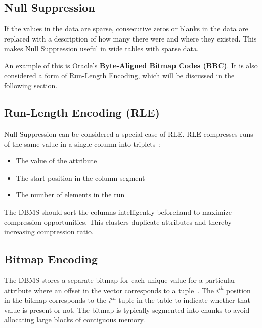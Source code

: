 \documentclass[11pt]{article}
\begin{document}
\subsection*{Null Suppression}
If the values in the data are sparse, consecutive zeros or blanks in the data are replaced with a description of how many there were and where they existed. This makes Null Suppression useful in wide tables with sparse data.

An example of this is Oracle’s \textbf{Byte-Aligned Bitmap Codes (BBC)}. It is also considered a form of Run-Length Encoding, which will be discussed in the following section.

\subsection*{Run-Length Encoding (RLE)}
Null Suppression can be considered a special case of RLE. RLE compresses runs of the same value in a single column into triplets~\cite{p31-roth}:
\begin{itemize}
    \item The value of the attribute
    \item The start position in the column segment
    \item The number of elements in the run
\end{itemize}
The DBMS should sort the columns intelligently beforehand to maximize compression opportunities. This clusters duplicate attributes and thereby increasing compression ratio.

\subsection*{Bitmap Encoding}
The DBMS stores a separate bitmap for each unique value for a particular attribute where an offset in the vector corresponds to a tuple~\cite{franklin14}. The $i^{th}$ position in the bitmap corresponds to the $i^{th}$ tuple in the table to indicate whether that value is present or not. The bitmap is typically segmented into chunks to avoid allocating large blocks of contiguous memory.
\end{document}
